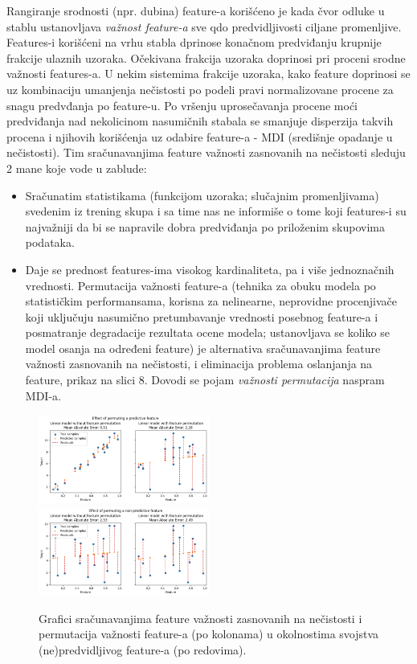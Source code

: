 \documentclass[fontsize=12bp, paper=a4]{scrarticle}
\begin{document}
Rangiranje srodnosti (npr. dubina) feature-a korišćeno je kada čvor odluke u stablu ustanovljava \textit{važnost feature-a} sve qdo predvidljivosti ciljane promenljive. Features-i korišćeni na vrhu stabla dprinose konačnom predviđanju krupnije frakcije ulaznih uzoraka. Očekivana frakcija uzoraka doprinosi pri proceni srodne važnosti features-a. U nekim sistemima frakcije uzoraka, kako feature doprinosi se uz kombinaciju umanjenja nečistosti po podeli pravi normalizovane procene za snagu predvđanja po feature-u. Po vršenju uprosečavanja procene moći predviđanja nad nekolicinom nasumičnih stabala se smanjuje disperzija takvih procena i njihovih korišćenja uz odabire feature-a - MDI (središnje opadanje u nečistosti).
Tim sračunavanjima feature važnosti zasnovanih na nečistosti sleduju 2 mane koje vode u zablude:
\begin{itemize}
    \item Sračunatim statistikama (funkcijom uzoraka; slučajnim promenljivama) svedenim iz trening skupa i sa time nas ne informiše o tome koji features-i su najvažniji da bi se napravile dobra predviđanja po priloženim skupovima podataka.
    \item Daje se prednost features-ima visokog kardinaliteta, pa i više jednoznačnih vrednosti. Permutacija važnosti feature-a (tehnika za obuku modela po statističkim performansama, korisna za nelinearne, neprovidne procenjivače koji uključuju nasumično pretumbavanje vrednosti posebnog feature-a i posmatranje degradacije rezultata ocene modela; ustanovljava se koliko se model osanja na određeni feature)\cite{permutation} je alternativa sračunavanjima feature važnosti zasnovanih na nečistosti, i eliminacija problema oslanjanja na feature, prikaz na slici 8. Dovodi se pojam \textit{važnosti permutacija} naspram MDI-a.
\end{itemize}
    \begin{figure}[h!]
        \centering
        \includegraphics[width=0.5\textwidth]{image-9.png}
        \includegraphics[width=0.5\textwidth]{image-7.png}
        \caption{Grafici sračunavanjima feature važnosti zasnovanih na nečistosti i permutacija važnosti feature-a (po kolonama) u okolnostima svojstva (ne)predvidljivog feature-a (po redovima).}
    \end{figure}
    
\end{document}
